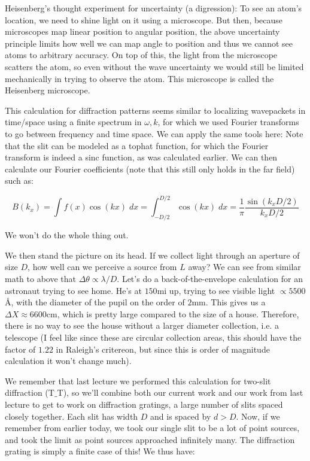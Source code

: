 \documentclass{report}
\begin{document}
Heisenberg's thought experiment for uncertainty (a digression): To see an atom's location, we need to shine light on it using a microscope. But then, because microscopes map linear position to angular position, the above uncertainty principle limits how well we can map angle to position and thus we cannot see atoms to arbitrary accuracy. On top of this, the light from the microscope scatters the atom, so even without the wave uncertainty we would still be limited mechanically in trying to observe the atom. This microscope is called the Heisenberg microscope.

This calculation for diffraction patterns seems similar to localizing wavepackets in time/space using a finite spectrum in $\omega,k$, for which we used Fourier transforms to go between frequency and time space. We can apply the same tools here: Note that the slit can be modeled as a tophat function, for which the Fourier transform is indeed a sinc function, as was calculated earlier. We can then calculate our Fourier coefficients (note that this still only holds in the far field) such as:

$$B(k_x) = \int{f(x)\cos(kx)\;dx} = \int_{-D/2}^{D/2} \cos(kx)\;dx = \frac{1}{\pi}\frac{\sin(k_xD/2)}{k_xD/2}$$

We won't do the whole thing out.

We then stand the picture on its head. If we collect light through an aperture of size $D$, how well can we perceive a source from $L$ away? We can see from similar math to above that $\Delta\theta \propto \lambda/D$. Let's do a back-of-the-envelope calculation for an astronaut trying to see home. He's at $150 \mathrm{mi}$ up, trying to see visible light $\propto 5500$\AA, with the diameter of the pupil on the order of $2$mm. This gives us a $\Delta X \approx 6600$cm, which is pretty large compared to the size of a house. Therefore, there is no way to see the house without a larger diameter collection, i.e. a telescope (I feel like since these are circular collection areas, this should have the factor of $1.22$ in Raleigh's critereon, but since this is order of magnitude calculation it won't change much). 

We remember that last lecture we performed this calculation for two-slit diffraction (T$\_$T), so we'll combine both our current work and our work from last lecture to get to work on diffraction gratings, a large number of slits spaced closely together. Each slit has width $D$ and is spaced by $d > D$. Now, if we remember from earlier today, we took our single slit to be a lot of point sources, and took the limit as point sources approached infinitely many. The diffraction grating is simply a finite case of this! We thus have:
\end{document}
